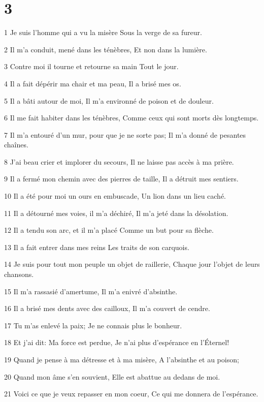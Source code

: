 \chapter{3}

\par 1 Je suis l'homme qui a vu la misère Sous la verge de sa fureur.
\par 2 Il m'a conduit, mené dans les ténèbres, Et non dans la lumière.
\par 3 Contre moi il tourne et retourne sa main Tout le jour.
\par 4 Il a fait dépérir ma chair et ma peau, Il a brisé mes os.
\par 5 Il a bâti autour de moi, Il m'a environné de poison et de douleur.
\par 6 Il me fait habiter dans les ténèbres, Comme ceux qui sont morts dès longtemps.
\par 7 Il m'a entouré d'un mur, pour que je ne sorte pas; Il m'a donné de pesantes chaînes.
\par 8 J'ai beau crier et implorer du secours, Il ne laisse pas accès à ma prière.
\par 9 Il a fermé mon chemin avec des pierres de taille, Il a détruit mes sentiers.
\par 10 Il a été pour moi un ours en embuscade, Un lion dans un lieu caché.
\par 11 Il a détourné mes voies, il m'a déchiré, Il m'a jeté dans la désolation.
\par 12 Il a tendu son arc, et il m'a placé Comme un but pour sa flèche.
\par 13 Il a fait entrer dans mes reins Les traits de son carquois.
\par 14 Je suis pour tout mon peuple un objet de raillerie, Chaque jour l'objet de leurs chansons.
\par 15 Il m'a rassasié d'amertume, Il m'a enivré d'absinthe.
\par 16 Il a brisé mes dents avec des cailloux, Il m'a couvert de cendre.
\par 17 Tu m'as enlevé la paix; Je ne connais plus le bonheur.
\par 18 Et j'ai dit: Ma force est perdue, Je n'ai plus d'espérance en l'Éternel!
\par 19 Quand je pense à ma détresse et à ma misère, A l'absinthe et au poison;
\par 20 Quand mon âme s'en souvient, Elle est abattue au dedans de moi.
\par 21 Voici ce que je veux repasser en mon coeur, Ce qui me donnera de l'espérance.
